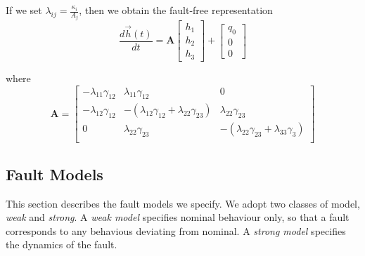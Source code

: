 
If we set $\lambda_{ij}= \frac{\kappa_i}{A_j}$, then we obtain the fault-free representation
\begin{equation}  \label{eq:linear-matrix}
\frac{d {\vec h}(t)}{dt}  =  
\mathbf{A}
\left[ \begin{array}{c} h_1 \\ h_2 \\ h_3 \end{array} \right]
+  \left[ \begin{array}{c} q_0 \\ 0 \\ 0 \end{array} \right]
\end{equation}

where
\begin{equation}  \label{eq:A-matrix}
\mathbf{A}  =  
\left[ \begin{array}{ccc}
-\lambda_{11}\gamma_{12} &  \lambda_{11}\gamma_{12} & 0 \\
-\lambda_{12}\gamma_{12} & -( \lambda_{12}\gamma_{12} +  \lambda_{22}\gamma_{23}) & \lambda_{22}\gamma_{23} \\
0 &  \lambda_{22}\gamma_{23} & -(  \lambda_{22}\gamma_{23} + \lambda_{33}\gamma_{3}) \\  
\end{array} \right]
\end{equation}

\subsection{Fault Models}
This section describes the fault models we specify. We adopt two classes of model, \textit{weak} and \textit{strong}.
A \textit{weak model} specifies nominal behaviour only, so that a fault corresponds to any behavious deviating from nominal.
A \textit{strong model} specifies the dynamics of the fault.
